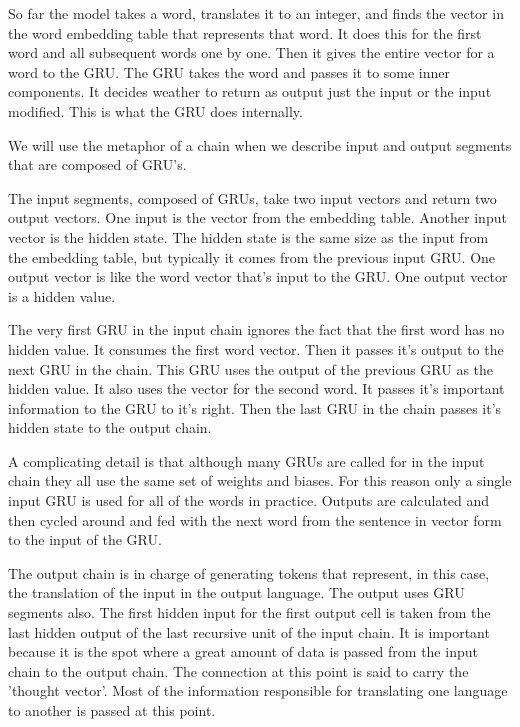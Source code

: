 So far the model takes a word, translates it to an integer, and finds the vector in the word embedding table that represents that word. It does this for the first word and all subsequent words one by one. Then it gives the entire vector for a word to the GRU. The GRU takes the word and passes it to some inner components. It decides weather to return as output just the input or the input modified. This is what the GRU does internally.

We will use the metaphor of a chain when we describe input and output segments that are composed of GRU's. 

The input segments, composed of GRUs, take two input vectors and return two output vectors. One input is the vector from the embedding table. Another input vector is the hidden state. The hidden state is the same size as the input from the embedding table, but typically it comes from the previous input GRU. One output vector is like the word vector that's input to the GRU. One output vector is a hidden value.



The very first GRU in the input chain ignores the fact that the first word has no hidden value. It consumes the first word vector. Then it passes it's output to the next GRU in the chain. This GRU uses the output of the previous GRU as the hidden value. It also uses the vector for the second word. It passes it's important information to the GRU to it's right. Then the last GRU in the chain passes it's hidden state to the output chain.



A complicating detail is that although many GRUs are called for in the input chain they all use the same set of weights and 
biases. For this reason only a single input GRU is used for all of the words in practice. Outputs are calculated and then cycled around and fed with the next word from the sentence in vector form to the input of the GRU. 


The output chain is in charge of generating tokens that represent, in this case, the translation of the input in the output language. The output uses GRU segments also. The first hidden input for the first output cell is taken from the 
last hidden output of the last recursive unit of the input chain. It is important because it is the spot where a great amount of data is passed from the input chain to the output chain. 
The connection at this point is said to carry the 'thought vector'. Most of the information responsible for translating one language to another is passed at this point.

